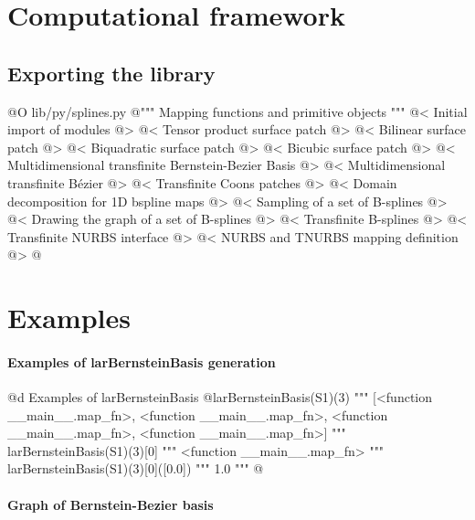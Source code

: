 \documentclass[11pt,oneside]{article}	%
\begin{document}
\section{Computational framework}
\subsection{Exporting the library}
@O lib/py/splines.py
@{""" Mapping functions and primitive objects """
@< Initial import of modules @>
@< Tensor product surface patch @>
@< Bilinear surface patch @>
@< Biquadratic surface patch @>
@< Bicubic surface patch @>
@< Multidimensional transfinite Bernstein-Bezier Basis @>
@< Multidimensional transfinite B\'ezier @>
@< Transfinite Coons patches @>
@< Domain decomposition for 1D bspline maps @>
@< Sampling of a set of B-splines @>
@< Drawing the graph of a set of B-splines @>
@< Transfinite B-splines @>
@< Transfinite NURBS interface @>
@< NURBS and TNURBS mapping definition @>
@}


\section{Examples}

\paragraph{Examples of larBernsteinBasis generation}

@d Examples of larBernsteinBasis
@{larBernsteinBasis(S1)(3) 
""" [<function __main__.map_fn>,
	<function __main__.map_fn>,
	<function __main__.map_fn>,
	<function __main__.map_fn>] """
larBernsteinBasis(S1)(3)[0]
""" <function __main__.map_fn> """
larBernsteinBasis(S1)(3)[0]([0.0])
""" 1.0 """
@}

\paragraph{Graph of Bernstein-Bezier basis}
\end{document}
